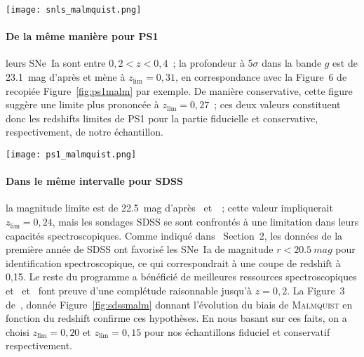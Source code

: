 \documentclass[../main/main.tex]{subfiles}
\begin{document}
\begin{SCfigure}[0.7][ht!]
    \centering
    \texttt{[image: snls\_malmquist.png]}
    \caption[Biais de \textsc{Malmquist} moyen en fonction du redshift pour le
    sondage SNLS]{Biais de \textsc{Malmquist} et de sélection spectroscopique
        moyen en fonction du redshift pour le sondage SNLS d'après des
        simulations.\smallbreak Tiré de~\cite{perrett2010}.}
    \label{fig:snlsmalm}
\end{SCfigure}

\paragraph*{De la même manière pour PS1} leurs SNe~Ia sont entre $0,2 < z <
0,4$~; la profondeur à 5$\sigma$ dans la bande $g$ est de \SI{23,1}{mag} d'après
\cite{rest2014} et mène à $z_{\lim}=0,31$, en correspondance avec la Figure~6
de~\cite{scolnic2018} recopiée Figure~\ref{fig:ps1malm} par exemple. De manière
conservative, cette figure suggère une limite plus prononcée à $z_{\lim}=0,27$~;
ces deux valeurs constituent donc les redshifts limites de PS1 pour la partie
fiducielle et conservative, respectivement, de notre échantillon.

\begin{SCfigure}[0.7][ht!]
    \centering
    \texttt{[image: ps1\_malmquist.png]}
    \caption[Biais de \textsc{Malmquist} moyen en fonction du redshift pour le
    sondage PS1]{Biais de \textsc{Malmquist} moyen dû aux effets de sélection
        en fonction du redshift pour le sondage PS1, d'après des simulations et
        pour deux modèles de dispersion intrinsèques différents et leur moyenne.
        \smallbreak Tiré de~\cite{scolnic2018}.}
    \label{fig:ps1malm}
\end{SCfigure}

\paragraph*{Dans le même intervalle pour SDSS} la magnitude limite est de
\SI{22,5}{mag} d'après~\cite{dilday2008} et~\cite{sako2008}~; cette valeur 
impliquerait $z_{\lim}=0,24$, mais les sondages SDSS se sont confrontés à une
limitation dans leurs capacités spectroscopiques. Comme indiqué
dans~\cite{kessler2009a} Section~2, les données de la première année de SDSS ont
favorisé les SNe~Ia de magnitude $r < \SI{20,5}{mag}$ pour identification
spectroscopique, ce qui correspondrait à une coupe de redshift à 0,15. Le reste
du programme a bénéficié de meilleures ressources spectroscopiques
et~\cite{kessler2009a} et~\cite{dilday2008} font preuve d'une complétude
raisonnable jusqu'à $z=0,2$. La Figure~3 de~\cite{conley2011}, donnée
Figure~\ref{fig:sdssmalm} donnant l'évolution du biais de \textsc{Malmquist} en
fonction du redshift confirme ces hypothèses. En nous basant sur ces faits, on a
choisi $z_{\lim}=0,20$ et $z_{\lim}=0,15$ pour nos échantillons fiduciel et
conservatif respectivement.
\end{document}
